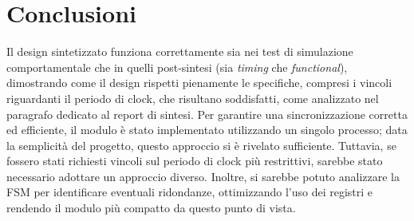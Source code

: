 \documentclass[11pt,a4paper]{article}
\begin{document}
\section{Conclusioni}
Il design sintetizzato funziona correttamente sia nei test di simulazione comportamentale che in quelli post-sintesi (sia \textit{timing} che \textit{functional}), dimostrando come il design rispetti pienamente le specifiche, compresi i vincoli riguardanti il periodo di clock, che risultano soddisfatti, come analizzato nel paragrafo dedicato al report di sintesi. Per garantire una sincronizzazione corretta ed efficiente, il modulo è stato implementato utilizzando un singolo processo; data la semplicità del progetto, questo approccio si è rivelato sufficiente. Tuttavia, se fossero stati richiesti vincoli sul periodo di clock più restrittivi, sarebbe stato necessario adottare un approccio diverso. Inoltre, si sarebbe potuto analizzare la FSM per identificare eventuali ridondanze, ottimizzando l'uso dei registri e rendendo il modulo più compatto da questo punto di vista.
\end{document}
